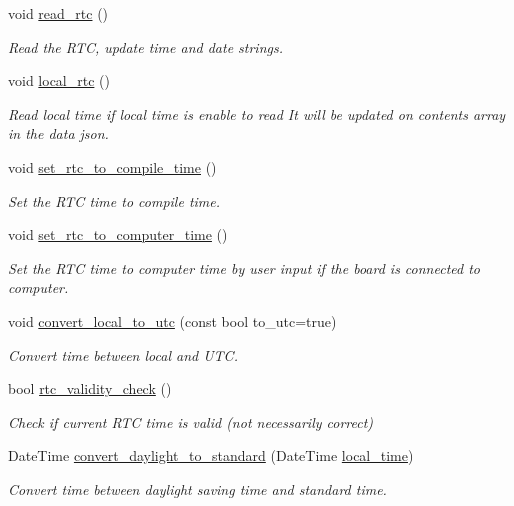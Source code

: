\begin{DoxyCompactItemize}
void \hyperlink{class_loom_r_t_c_a7ecd2d763167955581da55aab3602c11}{read\+\_\+rtc} ()
\begin{DoxyCompactList}\small\item\em Read the R\+TC, update time and date strings. \end{DoxyCompactList}\item 
void \hyperlink{class_loom_r_t_c_afd2c4c89a426678d754b7b59643b9d90}{local\+\_\+rtc} ()
\begin{DoxyCompactList}\small\item\em Read local time if local time is enable to read It will be updated on contents array in the data json. \end{DoxyCompactList}\item 
void \hyperlink{class_loom_r_t_c_a97c2b8e6e8c31f1865feb1ed8e1948df}{set\+\_\+rtc\+\_\+to\+\_\+compile\+\_\+time} ()
\begin{DoxyCompactList}\small\item\em Set the R\+TC time to compile time. \end{DoxyCompactList}\item 
void \hyperlink{class_loom_r_t_c_ab556620d00236ff10f4438f3b80c2636}{set\+\_\+rtc\+\_\+to\+\_\+computer\+\_\+time} ()
\begin{DoxyCompactList}\small\item\em Set the R\+TC time to computer time by user input if the board is connected to computer. \end{DoxyCompactList}\item 
void \hyperlink{class_loom_r_t_c_a41aa35e0b493300ab85c4028c117b51f}{convert\+\_\+local\+\_\+to\+\_\+utc} (const bool to\+\_\+utc=true)
\begin{DoxyCompactList}\small\item\em Convert time between local and U\+TC. \end{DoxyCompactList}\item 
bool \hyperlink{class_loom_r_t_c_a6a1bedc03dd44c013cf6b75000533e9f}{rtc\+\_\+validity\+\_\+check} ()
\begin{DoxyCompactList}\small\item\em Check if current R\+TC time is valid (not necessarily correct) \end{DoxyCompactList}\item 
Date\+Time \hyperlink{class_loom_r_t_c_ac2e7b1655fee21edb30e98fb415a92ee}{convert\+\_\+daylight\+\_\+to\+\_\+standard} (Date\+Time \hyperlink{class_loom_r_t_c_ab3d490dd52a5e2d2413d1f0c00944a7b}{local\+\_\+time})
\begin{DoxyCompactList}\small\item\em Convert time between daylight saving time and standard time. \end{DoxyCompactList}\item 

\end{DoxyCompactItemize}
